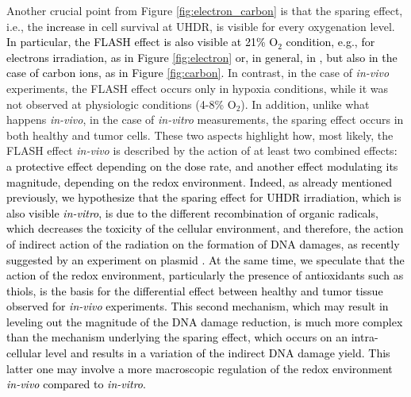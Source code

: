 \documentclass[10pt]{iopart}
\newcommand{\marco}[1]{\textcolor{black}{#1}}
\newcommand{\ema}[1]{\textcolor{black}{#1}}
\numberwithin{table}{section}
\begin{document}
Another crucial point from Figure \ref{fig:electron_carbon} is that the sparing effect, i.e., the \ema{increase} in cell survival at UHDR, is visible for every oxygenation level. \marco{In particular, the FLASH effect is also visible at 21\% $\mathrm{O_2}$ condition, e.g., for electrons irradiation, as in Figure \ref{fig:electron} or, in general, in \cite{Adrian2020, Adrian2021}, but also in the case of carbon ions, as in Figure \ref{fig:carbon}.} In contrast, in the case of \textit{in-vivo} experiments, the FLASH effect occurs only in hypoxia conditions, while it was not observed at physiologic conditions (4-8\% $\mathrm{O_2}$). In addition, unlike what happens \textit{in-vivo}, in the case of \textit{in-vitro} measurements, the sparing effect occurs in both healthy and tumor cells. These two aspects highlight how, most likely, the FLASH effect \textit{in-vivo} is described by the action of at least two combined effects\ema{: a protective effect depending on the dose rate, and another effect modulating its magnitude, depending on the redox environment}. \marco{Indeed, as already mentioned previously, we hypothesize that the sparing effect for UHDR irradiation, which is also visible \textit{in-vitro}, is due to the different recombination of organic radicals, which decreases the toxicity of the cellular environment, and therefore, the action of indirect action of the radiation on the formation of DNA damages, as recently suggested by an experiment on plasmid \cite{Wanstall2024}. At the same time, we speculate that the action of the redox environment, particularly the presence of antioxidants such as thiols, is the basis for the differential effect between healthy and tumor tissue observed for \textit{in-vivo} experiments. This second mechanism, \ema{which may result in leveling out the magnitude of the DNA damage reduction}, is much more complex than the mechanism underlying the sparing effect, which occurs on an intra-cellular level and results in a variation of the indirect DNA damage yield. This latter one may involve a more macroscopic regulation of the redox environment \textit{in-vivo} compared to \textit{in-vitro}.} 
\end{document}
